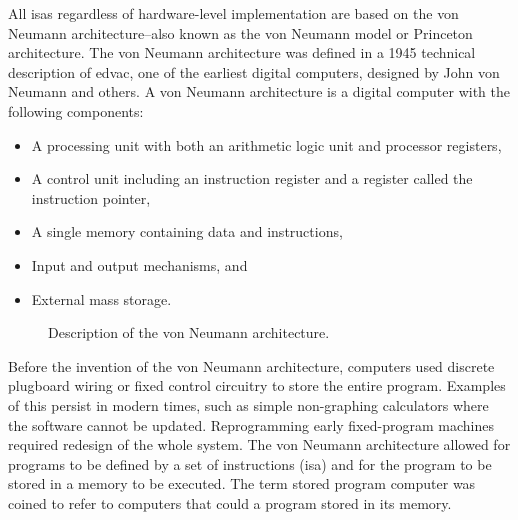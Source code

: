 \documentclass[letterpaper, 12pt]{book}
\begin{document}
All \glspl{isa} regardless of hardware-level implementation are based on the \gls{von Neumann architecture}--also known 
as the von Neumann model or Princeton architecture. The \gls{von Neumann architecture} was defined in a 1945 technical %
description of \gls{edvac}, one of the 
earliest digital computers, designed by John von Neumann and others. A \gls{von Neumann architecture} is a digital computer 
with the following components: 
%
\begin{itemize}
    \item A processing unit with both an \gls{arithmetic logic unit} and processor \glspl{register},
    \item A \gls{control unit} including an \gls{instruction register} and a register called the \gls{instruction pointer},
    \item A single memory containing data and instructions,
    \item Input and output mechanisms, and
    \item External mass storage.
\end{itemize}
%

\begin{figure}\centering
    \caption{Description of the von Neumann architecture.\label{fig:vonNeumann}}
\end{figure}

Before the invention of the \gls{von Neumann architecture}, computers used discrete plugboard wiring or fixed
control circuitry to store the entire program. Examples of this persist in modern times, such as simple non-graphing calculators 
where the software cannot be updated. Reprogramming early fixed-program machines required redesign of the whole 
system. The \gls{von Neumann architecture} allowed for programs to be defined by a set of instructions (\gls{isa})
and for the program to be stored in a memory to be executed. The term \gls{stored program computer} was coined to refer 
to computers that could a program stored in its memory. 
\end{document}
